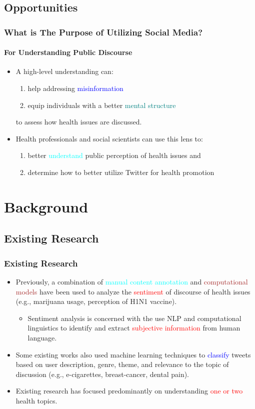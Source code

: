 \documentclass[11pt]{beamer}
\begin{document}
\subsection{Opportunities}
\begin{frame}
\frametitle{What is The Purpose of Utilizing Social Media?}
\framesubtitle{For Understanding Public Discourse}
\begin{itemize}
	\item<2-> A high-level understanding can:
	\begin{enumerate}
		\item help addressing \textcolor{blue}{misinformation}
		\item equip individuals with a better \textcolor{teal}{mental structure}
	\end{enumerate}
	to assess how health issues are discussed.
	\item<3-> Health professionals and social scientists can use this lens to:
	\begin{enumerate}
		\item better \textcolor{cyan}{understand} public perception of health issues and
		\item determine how to better utilize Twitter for \textcolor{uwo-purple}{health promotion}
	\end{enumerate}
\end{itemize}
\end{frame}

\section{Background}
\subsection{Existing Research}
\begin{frame}
\frametitle{Existing Research}
	\begin{itemize}
		\item<1->Previously, a combination of \textcolor{cyan}{manual content annotation} and \textcolor{brown}{computational models} have been used to analyze the \textcolor{red}{sentiment} of discourse of health issues (e.g., marijuana usage, perception of H1N1 vaccine).
		\begin{itemize}
			\item<2->Sentiment analysis is concerned with the use NLP and computational linguistics to identify and extract \textcolor{red}{subjective information} from human language.
		\end{itemize}
		\item<3->Some existing works also used machine learning techniques to \textcolor{blue}{classify} tweets based on user description, genre, theme, and relevance to the topic of discussion (e.g., e-cigarettes, breast-cancer, dental pain).
		\item<4-> Existing research has focused predominantly on understanding \textcolor{red}{one or two} health topics.
		
	\end{itemize}
\end{frame}
\end{document}
